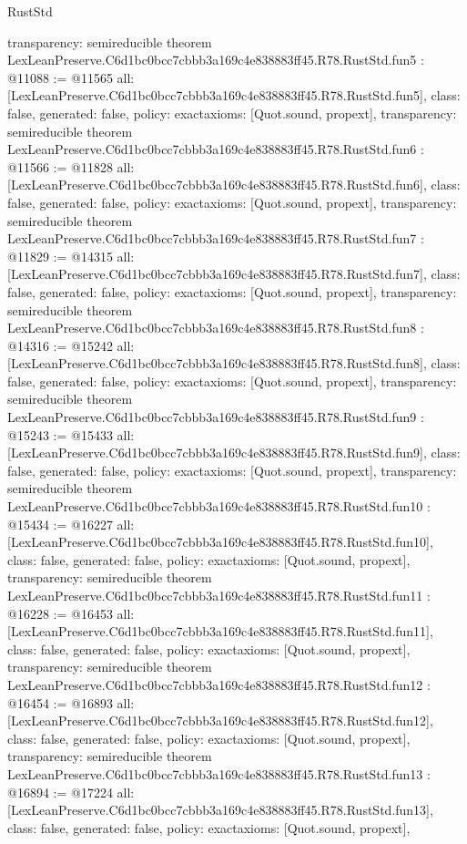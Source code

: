 \begin{lexlean}{RustStd}
\begin{coremodule}
{  transparency: semireducible
}
theorem LexLeanPreserve.C6d1bc0bcc7cbbb3a169c4e838883ff45.R78.RustStd.fun5 : @11088 := @11565 {
  all: [LexLeanPreserve.C6d1bc0bcc7cbbb3a169c4e838883ff45.R78.RustStd.fun5],
  class: false,
  generated: false,
  policy: exact{axioms: [Quot.sound, propext]},
  transparency: semireducible
}
theorem LexLeanPreserve.C6d1bc0bcc7cbbb3a169c4e838883ff45.R78.RustStd.fun6 : @11566 := @11828 {
  all: [LexLeanPreserve.C6d1bc0bcc7cbbb3a169c4e838883ff45.R78.RustStd.fun6],
  class: false,
  generated: false,
  policy: exact{axioms: [Quot.sound, propext]},
  transparency: semireducible
}
theorem LexLeanPreserve.C6d1bc0bcc7cbbb3a169c4e838883ff45.R78.RustStd.fun7 : @11829 := @14315 {
  all: [LexLeanPreserve.C6d1bc0bcc7cbbb3a169c4e838883ff45.R78.RustStd.fun7],
  class: false,
  generated: false,
  policy: exact{axioms: [Quot.sound, propext]},
  transparency: semireducible
}
theorem LexLeanPreserve.C6d1bc0bcc7cbbb3a169c4e838883ff45.R78.RustStd.fun8 : @14316 := @15242 {
  all: [LexLeanPreserve.C6d1bc0bcc7cbbb3a169c4e838883ff45.R78.RustStd.fun8],
  class: false,
  generated: false,
  policy: exact{axioms: [Quot.sound, propext]},
  transparency: semireducible
}
theorem LexLeanPreserve.C6d1bc0bcc7cbbb3a169c4e838883ff45.R78.RustStd.fun9 : @15243 := @15433 {
  all: [LexLeanPreserve.C6d1bc0bcc7cbbb3a169c4e838883ff45.R78.RustStd.fun9],
  class: false,
  generated: false,
  policy: exact{axioms: [Quot.sound, propext]},
  transparency: semireducible
}
theorem LexLeanPreserve.C6d1bc0bcc7cbbb3a169c4e838883ff45.R78.RustStd.fun10 : @15434 := @16227 {
  all: [LexLeanPreserve.C6d1bc0bcc7cbbb3a169c4e838883ff45.R78.RustStd.fun10],
  class: false,
  generated: false,
  policy: exact{axioms: [Quot.sound, propext]},
  transparency: semireducible
}
theorem LexLeanPreserve.C6d1bc0bcc7cbbb3a169c4e838883ff45.R78.RustStd.fun11 : @16228 := @16453 {
  all: [LexLeanPreserve.C6d1bc0bcc7cbbb3a169c4e838883ff45.R78.RustStd.fun11],
  class: false,
  generated: false,
  policy: exact{axioms: [Quot.sound, propext]},
  transparency: semireducible
}
theorem LexLeanPreserve.C6d1bc0bcc7cbbb3a169c4e838883ff45.R78.RustStd.fun12 : @16454 := @16893 {
  all: [LexLeanPreserve.C6d1bc0bcc7cbbb3a169c4e838883ff45.R78.RustStd.fun12],
  class: false,
  generated: false,
  policy: exact{axioms: [Quot.sound, propext]},
  transparency: semireducible
}
theorem LexLeanPreserve.C6d1bc0bcc7cbbb3a169c4e838883ff45.R78.RustStd.fun13 : @16894 := @17224 {
  all: [LexLeanPreserve.C6d1bc0bcc7cbbb3a169c4e838883ff45.R78.RustStd.fun13],
  class: false,
  generated: false,
  policy: exact{axioms: [Quot.sound, propext]},
}
\end{coremodule}
\end{lexlean}
